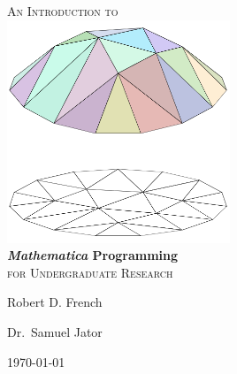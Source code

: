 \begin{titlepage}
\begin{center}
\textsc{\LARGE An Introduction to}\\[1.5cm]
\includegraphics[width=0.5\textwidth]{500px-Piecewise_linear_function2D.png}\\[1cm]    
{ \huge \bfseries \emph{Mathematica} Programming}\\[0.4cm]
\textsc{\Large for Undergraduate Research}\\[0.5cm]
\begin{minipage}{0.4\textwidth}
\begin{flushleft} \large
Robert D. French
\end{flushleft}
\end{minipage}
\begin{minipage}{0.4\textwidth}
\begin{flushright} \large
Dr.~Samuel Jator
\end{flushright}
\end{minipage}
\vfill
{\large \today}
\end{center}
\end{titlepage}
